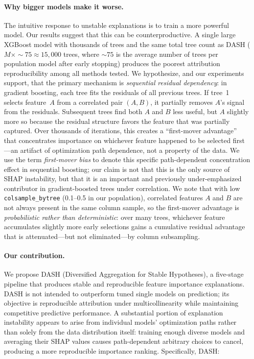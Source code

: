 \documentclass[11pt]{article}
\newcommand{\dash}{\textsc{DASH}}
\begin{document}
\paragraph{Why bigger models make it worse.}
The intuitive response to unstable explanations is to train a more powerful
model. Our results suggest that this can be counterproductive. A single large
XGBoost model with thousands of trees and the same total tree count as \dash{} ($M \times {\sim}75 \approx 15{,}000$ trees, where ${\sim}75$ is the average number of trees per population model after early stopping) produces the poorest attribution reproducibility among all methods
tested. We hypothesize, and our experiments support, that
the primary mechanism is \emph{sequential residual dependency}: in gradient boosting,
each tree fits the residuals of all previous trees. If tree~1 selects
feature~$A$ from a correlated pair $(A, B)$, it partially removes $A$'s
signal from the residuals. Subsequent trees find both $A$ and $B$ less
useful, but $A$ slightly more so because the residual structure favors the
feature that was partially captured. Over thousands of iterations, this
creates a ``first-mover advantage'' that concentrates importance on
whichever feature happened to be selected first---an artifact of
optimization path dependence, not a property of the data.
We use the term \emph{first-mover bias} to denote this specific
path-dependent concentration effect in sequential boosting;
our claim is not that this is the only source of SHAP instability,
but that it is an important and previously under-emphasized contributor
in gradient-boosted trees under correlation.
We note that with low \texttt{colsample\_bytree} (0.1--0.5 in our
population), correlated features $A$ and $B$ are not always present
in the same column sample, so the first-mover advantage is
\emph{probabilistic rather than deterministic}: over many trees,
whichever feature accumulates slightly more early selections gains a
cumulative residual advantage that is attenuated---but not eliminated---by
column subsampling.

\paragraph{Our contribution.}
We propose \dash{} (Diversified Aggregation for Stable Hypotheses), a five-stage
pipeline that produces stable and reproducible feature importance
explanations. \dash{} is not intended to outperform tuned single models on
prediction; its objective is reproducible attribution under multicollinearity
while maintaining competitive predictive performance. A substantial portion of explanation instability appears to arise from
individual models' optimization paths rather than solely from the data
distribution itself: training enough diverse models and averaging their
SHAP values causes path-dependent arbitrary choices to cancel,
producing a more reproducible importance ranking. Specifically, \dash{}:
\end{document}
